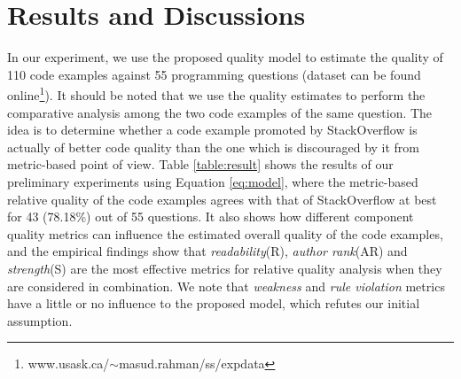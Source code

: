 \documentclass{sig-alternate}
\begin{document}
\vspace{-.1cm}
\section{Results and Discussions}
\label{sec:experiment}
In our experiment, we use the proposed quality model to estimate the quality of 110 code examples against 55 programming questions (dataset can be found online\footnote{www.usask.ca/$\sim$masud.rahman/ss/expdata}). It should be noted that we use the quality estimates to perform the comparative analysis among the two code examples of the same question. The idea is to determine whether a code example promoted by StackOverflow is actually of better code quality than the one which is discouraged by it from metric-based point of view. Table \ref{table:result} shows the results of our preliminary experiments using Equation \eqref{eq:model}, where the metric-based relative quality of the code examples agrees with that of StackOverflow at best for 43 (78.18\%)  out of 55 questions. It also shows how different component quality metrics can influence the estimated overall quality of the code examples, and the empirical findings show that \emph{readability}(R), \emph{author rank}(AR) and \emph{strength}(S) are the most effective metrics for relative quality analysis when they are considered in combination. We note that \emph{weakness} and \emph{rule violation} metrics have a little or no influence to the proposed model, which refutes our initial assumption.
\end{document}
